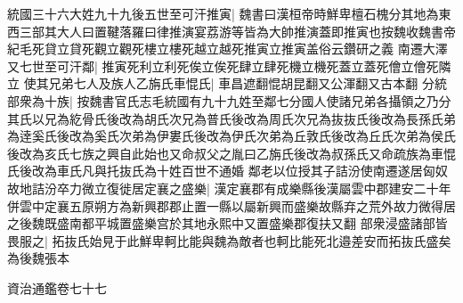 統國三十六大姓九十九後五世至可汗推寅|{
	魏書曰漢桓帝時鮮卑檀石槐分其地為東西三部其大人曰置鞬落羅曰律推演宴荔游等皆為大帥推演蓋即推寅也按魏收魏書帝紀毛死貸立貸死觀立觀死樓立樓死越立越死推寅立推寅盖俗云鑽研之義}
南遷大澤又七世至可汗鄰|{
	推寅死利立利死俟立俟死肆立肆死機立機死蓋立蓋死儈立儈死隣立}
使其兄弟七人及族人乙旃氏車惃氏|{
	車昌遮翻惃胡昆翻又公渾翻又古本翻}
分統部衆為十族|{
	按魏書官氏志毛統國有九十九姓至鄰七分國人使諸兄弟各攝領之乃分其氏以兄為紇骨氏後改為胡氏次兄為普氏後改為周氏次兄為抜抜氏後改為長孫氏弟為逹奚氏後改為奚氏次弟為伊婁氏後改為伊氏次弟為丘敦氏後改為丘氏次弟為侯氏後改為亥氏七族之興自此始也又命叔父之胤曰乙旃氏後改為叔孫氏又命疏族為車惃氏後改為車氏凡與托抜氏為十姓百世不通婚}
鄰老以位授其子詰汾使南遷遂居匈奴故地詰汾卒力微立復徙居定襄之盛樂|{
	漢定襄郡有成樂縣後漢屬雲中郡建安二十年併雲中定襄五原朔方為新興郡郡止置一縣以屬新興而盛樂故縣弃之荒外故力微得居之後魏既盛南都平城置盛樂宫於其地永熙中又置盛樂郡復扶又翻}
部衆浸盛諸部皆畏服之|{
	拓抜氏始見于此鮮卑軻比能與魏為敵者也軻比能死北邉差安而拓抜氏盛矣為後魏張本}


資治通鑑卷七十七
